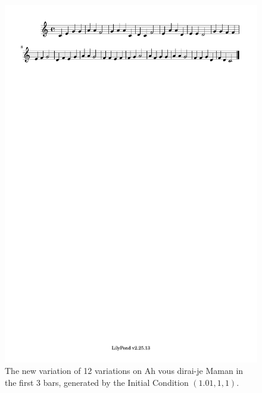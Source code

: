 \documentclass[11pt]{article}
\theoremstyle{definition}
\begin{document}
\begin{figure}
\centering
\includegraphics[trim=1cm 26.5cm 10.1cm 0.02cm, clip, scale=1]{dabby_2.pdf}
\caption{The new variation of 12 variations on Ah vous dirai-je Maman in the first 3 bars, generated by the Initial Condition $(1.01, 1, 1)$.}
\label{fig:Dabby2}
\end{figure}
\end{document}
